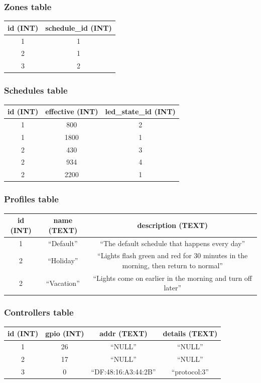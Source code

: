 			\subsubsection{Zones table}
				\begin{tabular}{ |c|c| }
					\hline
					id (INT) & schedule\_id (INT) \\
					\hline
					1 & 1 \\
					2 & 1 \\
					3 & 2 \\
					\hline
				\end{tabular}

			\subsubsection{Schedules table}
				\begin{tabular}{ |c|c|c| }
					\hline
					id (INT) & effective (INT) & led\_state\_id (INT) \\
					\hline
					1 & 800 & 2 \\
					1 & 1800 & 1 \\
					2 & 430 & 3 \\
					2 & 934 & 4 \\
					2 & 2200 & 1 \\
					\hline
				\end{tabular}

			\subsubsection{Profiles table}
				\begin{tabular}{ |c|c|c| }
					\hline
					id (INT) & name (TEXT) & description (TEXT) \\
					\hline
					1 & ``Default'' & ``The default schedule that happens every day'' \\
					2 & ``Holiday'' & ``Lights flash green and red for 30 minutes in the morning, then return to normal'' \\
					2 & ``Vacation'' & ``Lights come on earlier in the morning and turn off later'' \\
					\hline
				\end{tabular}

			\subsubsection{Controllers table}
				\begin{tabular}{ |c|c|c|c| }
					\hline
					id (INT) & gpio (INT) & addr (TEXT) & details (TEXT) \\
					\hline
					1 & 26 & ``NULL'' & ``NULL'' \\
					2 & 17 & ``NULL'' & ``NULL'' \\
					3 & 0 & ``DF:48:16:A3:44:2B'' & ``protocol:3'' \\
					\hline
				\end{tabular}


